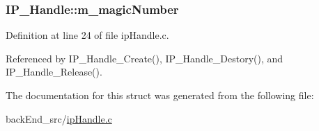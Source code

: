 \subsubsection[{\texorpdfstring{m\+\_\+magic\+Number}{m_magicNumber}}]{ I\+P\+\_\+\+Handle\+::m\+\_\+magic\+Number}\hypertarget{structIP__Handle_aa3280409df4f55a4a984f5c590ca2a10}{}\label{structIP__Handle_aa3280409df4f55a4a984f5c590ca2a10}


Definition at line 24 of file ip\+Handle.\+c.



Referenced by I\+P\+\_\+\+Handle\+\_\+\+Create(), I\+P\+\_\+\+Handle\+\_\+\+Destory(), and I\+P\+\_\+\+Handle\+\_\+\+Release().



The documentation for this struct was generated from the following file\+:\begin{DoxyCompactItemize}
\item 
back\+End\+\_\+src/\hyperlink{ipHandle_8c}{ip\+Handle.\+c}\end{DoxyCompactItemize}
